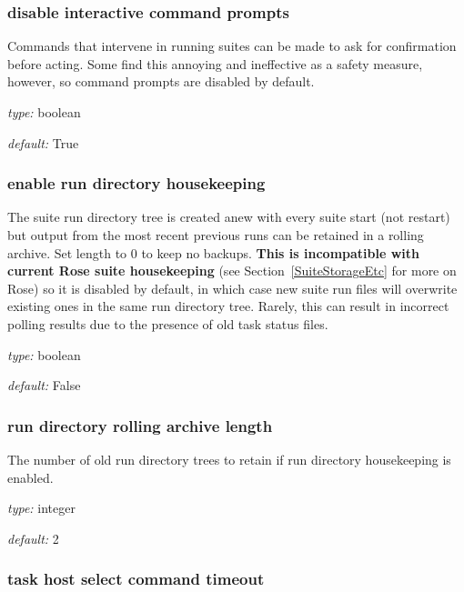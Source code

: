 \subsubsection{disable interactive command prompts}

Commands that intervene in running suites can be made to ask for
confirmation before acting. Some find this annoying and ineffective as a
safety measure, however, so command prompts are disabled by default.

\begin{myitemize}
\item {\em type:} boolean
\item {\em default:} True
\end{myitemize}

\subsubsection{enable run directory housekeeping}

The suite run directory tree is created anew with every suite start
(not restart) but output from the most recent previous runs can be
retained in a rolling archive. Set length to 0 to keep no backups.
{\bf This is incompatible with current Rose suite housekeeping} (see
Section~\ref{SuiteStorageEtc} for more on Rose) so it is disabled by
default, in which case new suite run files will overwrite existing ones
in the same run directory tree. Rarely, this can result in incorrect
polling results due to the presence of old task status files.

\begin{myitemize}
\item {\em type:} boolean
\item {\em default:} False
\end{myitemize}

\subsubsection{run directory rolling archive length}

The number of old run directory trees to retain if run directory
housekeeping is enabled.
\begin{myitemize}
\item {\em type:} integer
\item {\em default:} 2
\end{myitemize}

\subsubsection{task host select command timeout}

